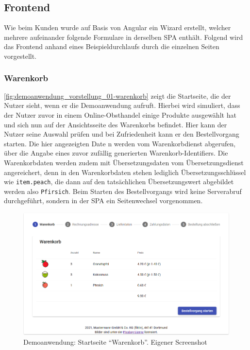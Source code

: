 \subsection{Frontend}

Wie beim Kunden wurde auf Basis von Angular ein Wizard erstellt, welcher mehrere aufeinander folgende Formulare in derselben SPA enthält. Folgend wird das Frontend anhand eines Beispieldurchlaufs durch die einzelnen Seiten vorgestellt.

\subsubsection{Warenkorb}

\autoref{fig:demoanwendung_vorstellung_01-warenkorb} zeigt die Startseite, die der Nutzer sieht, wenn er die Demoanwendung aufruft. Hierbei wird simuliert, dass der Nutzer zuvor in einem Online-Obsthandel einige Produkte ausgewählt hat und sich nun auf der Ansichtsseite des Warenkorbs befindet. Hier kann der Nutzer seine Auswahl prüfen und bei Zufriedenheit kann er den Bestellvorgang starten. Die hier angezeigten Date
n werden vom Warenkorbdienst abgerufen, über die Angabe eines zuvor zufällig generierten Warenkorb-Identifiers. Die Warenkorbdaten werden zudem mit Übersetzungsdaten vom Übersetzungsdienst angereichert, denn in den Warenkorbdaten stehen lediglich Übersetzungsschlüssel wie \texttt{item.peach}, die dann auf den tatsächlichen Übersetzungswert abgebildet werden also \texttt{Pfirsich}. Beim Starten des Bestellvorgangs wird keine Serverabruf durchgeführt, sondern in der SPA ein Seitenwechsel vorgenommen.

\begin{figure}[H]
	\centering
	\includegraphics[width=1.00\linewidth]{img/04_erstellung-poc/demoanwendung_vorstellung_01-warenkorb.png}
	\caption{Demoanwendung: Startseite \enquote{Warenkorb}. Eigener Screenshot}
	\label{fig:demoanwendung_vorstellung_01-warenkorb}
\end{figure}

